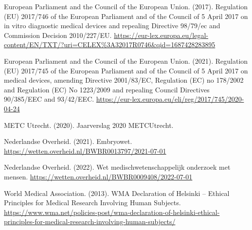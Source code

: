 \documentclass[authordate, meta]{jote-new-article}
\begin{document}
European Parliament and the Council of the European Union. (2017). Regulation (EU) 2017/746 of the European Parliament and of the Council of 5 April 2017 on in vitro diagnostic medical devices and repealing Directive 98/79/ec and Commission Decision 2010/227/EU. \url{https://eur-lex.europa.eu/legal-content/EN/TXT/?uri=CELEX%3A32017R0746&qid=1687428283895}

European Parliament and the Council of the European Union. (2021). Regulation (EU) 2017/745 of the European Parliament and of the Council of 5 April 2017 on medical devices, amending Directive 2001/83/EC, Regulation (EC) no 178/2002 and Regulation (EC) No 1223/2009 and repealing Council Directives 90/385/EEC and 93/42/EEC. \url{https://eur-lex.europa.eu/eli/reg/2017/745/2020-04-24}

METC Utrecht. (2020). Jaarverslag 2020 METCUtrecht.

Nederlandse Overheid. (2021). Embryowet. \url{https://wetten.overheid.nl/BWBR0013797/2021-07-01}

Nederlandse Overheid. (2022). Wet medischwetenschappelijk onderzoek met mensen. \url{https://wetten.overheid.nl/BWBR0009408/2022-07-01}

World Medical Association. (2013). WMA Declaration of Helsinki – Ethical Principles for Medical Research Involving Human Subjects. \url{https://www.wma.net/policies-post/wma-declaration-of-helsinki-ethical-principles-for-medical-research-involving-human-subjects/}
\end{document}
